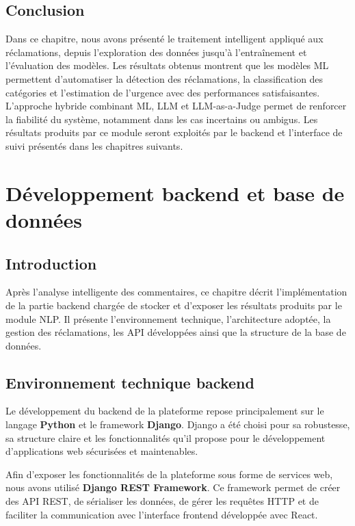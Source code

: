 \documentclass[12pt,a4paper,oneside]{report}
\begin{document}
\vspace{-0.4cm}
\section{Conclusion}
Dans ce chapitre, nous avons présenté le traitement intelligent appliqué aux réclamations, depuis l’exploration des données jusqu’à l’entraînement et l’évaluation des modèles. Les résultats obtenus montrent que les modèles ML permettent d’automatiser la détection des réclamations, la classification des catégories et l’estimation de l’urgence avec des performances satisfaisantes. L’approche hybride combinant ML, LLM et LLM-as-a-Judge permet de renforcer la fiabilité du système, notamment dans les cas incertains ou ambigus. Les résultats produits par ce module seront exploités par le backend et l’interface de suivi présentés dans les chapitres suivants.


\chapter{Développement backend et base de données}

\section{Introduction}
Après l’analyse intelligente des commentaires, ce chapitre décrit l’implémentation de la partie backend chargée de stocker et d’exposer les résultats produits par le module NLP. Il présente l’environnement technique, l’architecture adoptée, la gestion des réclamations, les API développées ainsi que la structure de la base de données.

\section{Environnement technique backend}

Le développement du backend de la plateforme repose principalement sur le langage \textbf{Python} et le framework \textbf{Django}. Django a été choisi pour sa robustesse, sa structure claire et les fonctionnalités qu’il propose pour le développement d’applications web sécurisées et maintenables.

Afin d’exposer les fonctionnalités de la plateforme sous forme de services web, nous avons utilisé \textbf{Django REST Framework}. Ce framework permet de créer des API REST, de sérialiser les données, de gérer les requêtes HTTP et de faciliter la communication avec l’interface frontend développée avec React.
\end{document}
